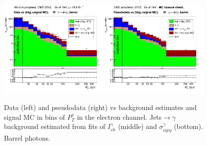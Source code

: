 \begin{figure}[htb]
\begin{center}
   \includegraphics[width=0.48\textwidth]{../figs/figs_v11/ELECTRON_WGamma/PrepareYields/c_DATAvsBkgPlusSigMCc_ELECTRON_WGamma_TEMPL_SIHIH_UNblind__Barrel__phoEt.png}\includegraphics[width=0.48\textwidth]{../figs/figs_v11/ELECTRON_WGamma/PrepareYields/c_DATAvsBkgPlusSigMCc_ELECTRON_WGamma_TEMPL_SIHIH_UNblind_MCclosure__Barrel__phoEt_MCclosure.png}
  \caption{Data (left) and pseudodata (right) vs background estimates and signal MC in bins of $P_T^{\gamma}$ in the electron channel. Jets$\rightarrow\gamma$ background estimated from fits of $I_{ch}^{\gamma}$ (middle) and  $\sigma_{i\eta i\eta}^{\gamma}$ (bottom). Barrel photons.}
  \label{fig:DATAvsBKGandSIGMC_MCclosure_ELECTRON_B}
  \end{center}
\end{figure}


